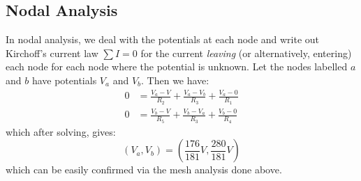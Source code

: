 \documentclass{article}
\begin{document}
    \subsection{Nodal Analysis}
    In nodal analysis, we deal with the potentials at each node and write out Kirchoff's current law $\sum I = 0$ for the current \textit{leaving} (or alternatively, entering) each node for each node where the potential is unknown. Let the nodes labelled $a$ and $b$ have potentials $V_a$ and $V_b$. Then we have:
    \begin{align}
        0 &= \frac{V_a-V}{R_2} + \frac{V_a-V_b}{R_3} + \frac{V_a-0}{R_1} \\
        0 &= \frac{V_b-V}{R_5} + \frac{V_b-V_a}{R_3} + \frac{V_b-0}{R_4} 
    \end{align}
    which after solving, gives:
    \begin{equation}
        (V_a, V_b) = \left(\frac{176}{181}\si{V}, \frac{280}{181}\si{V}\right)
    \end{equation}
    which can be easily confirmed via the mesh analysis done above.
\end{document}
